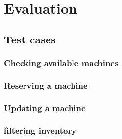 \chapter{Evaluation}
\label{chap:ch4_abbr}
\section{Test cases}
\subsection{Checking available machines}
\subsection{Reserving a machine}
\subsection{Updating a machine}
\subsection{filtering inventory}


